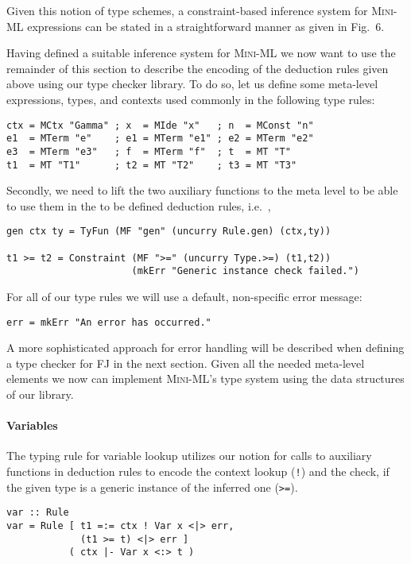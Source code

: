 Given this notion of type schemes, a constraint-based inference system
for \textsc{Mini-ML} expressions can be stated in a straightforward
manner as given in Fig.~6.

Having defined a suitable inference system for \textsc{Mini-ML} we now
want to use the remainder of this section to describe the encoding of
the deduction rules given above using our type checker library. To do
so, let us define some meta-level expressions, types, and contexts
used commonly in the following type rules:
\begin{lstlisting}
ctx = MCtx "Gamma" ; x  = MIde "x"   ; n  = MConst "n"
e1  = MTerm "e"    ; e1 = MTerm "e1" ; e2 = MTerm "e2"
e3  = MTerm "e3"   ; f  = MTerm "f"  ; t  = MT "T"
t1  = MT "T1"      ; t2 = MT "T2"    ; t3 = MT "T3"
\end{lstlisting}



Secondly, we need to lift the two auxiliary functions to the
meta level to be able to use them in the to be defined deduction
rules, i.e.~,

\begin{lstlisting}
gen ctx ty = TyFun (MF "gen" (uncurry Rule.gen) (ctx,ty))

t1 >= t2 = Constraint (MF ">=" (uncurry Type.>=) (t1,t2))
                      (mkErr "Generic instance check failed.")
\end{lstlisting}

For all of our type rules we will use a default, non-specific error
message:
\begin{lstlisting}
err = mkErr "An error has occurred."
\end{lstlisting}
A more sophisticated approach for error handling will be described
when defining a type checker for \textsc{FJ} in the next
section. Given all the needed meta-level elements we now can implement
\textsc{Mini-ML}'s type system using the data structures of our
library.

\paragraph{Variables} The typing rule for variable lookup utilizes our
notion for calls to auxiliary functions in deduction rules to encode
the context lookup (\texttt{!}) and the check, if the given type is a
generic instance of the inferred one (\texttt{>=}).
\begin{lstlisting}
var :: Rule
var = Rule [ t1 =:= ctx ! Var x <|> err,
             (t1 >= t) <|> err ]
           ( ctx |- Var x <:> t )
\end{lstlisting}

